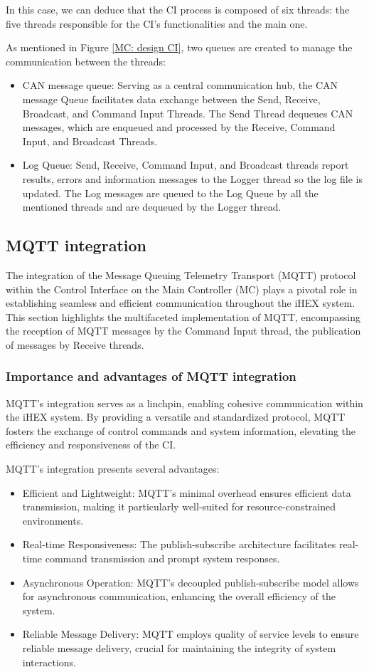 In this case, we can deduce that the CI process is composed of six threads: the five threads responsible for the CI's functionalities and the main one.

As mentioned in Figure \ref{MC: design CI}, two queues are created to manage the communication between the threads:
\begin{itemize}
    \item CAN message queue: Serving as a central communication hub, the CAN message Queue facilitates data exchange between the Send, Receive, Broadcast, and Command Input Threads. The Send Thread dequeues CAN messages, which are enqueued and processed by the Receive, Command Input, and Broadcast Threads.
    \item Log Queue: Send, Receive, Command Input, and Broadcast threads report results, errors and information messages to the Logger thread so the log file is updated. The Log messages are queued to the Log Queue by all the mentioned threads and are dequeued by the Logger thread.
\end{itemize}

\subsection{MQTT integration}
The integration of the Message Queuing Telemetry Transport (MQTT) protocol within the Control Interface on the Main Controller (MC) plays a pivotal role in establishing seamless and efficient communication throughout the iHEX system. This section highlights the multifaceted implementation of MQTT, encompassing the reception of MQTT messages by the Command Input thread, the publication of messages by Receive threads.

\subsubsection{Importance and advantages of MQTT integration}
MQTT's integration serves as a linchpin, enabling cohesive communication within the iHEX system. By providing a versatile and standardized protocol, MQTT fosters the exchange of control commands and system information, elevating the efficiency and responsiveness of the CI. \cite{R25}

MQTT's integration presents several advantages:
\begin{itemize}
    \item Efficient and Lightweight: MQTT's minimal overhead ensures efficient data transmission, making it particularly well-suited for resource-constrained environments.
    \item Real-time Responsiveness: The publish-subscribe architecture facilitates real-time command transmission and prompt system responses.
    \item Asynchronous Operation: MQTT's decoupled publish-subscribe model allows for asynchronous communication, enhancing the overall efficiency of the system.
    \item Reliable Message Delivery: MQTT employs quality of service levels to ensure reliable message delivery, crucial for maintaining the integrity of system interactions.
\end{itemize}


